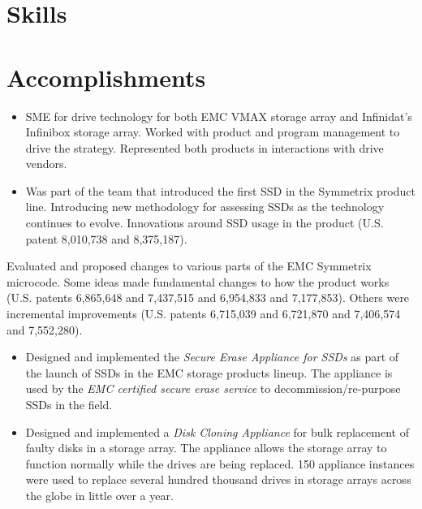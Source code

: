 \documentclass[12pt,a4paper,sans]{moderncv}
\begin{document}
\makecvtitle

\section{Skills}
\section{Accomplishments}
{\begin{itemize}
        \item {SME for drive technology for both EMC VMAX storage array and Infinidat's
        Infinibox storage array.  Worked with product and program management to drive the strategy.
    Represented both products in interactions with drive vendors.}
        \item {Was part of the team that introduced the first SSD in the Symmetrix product line. Introducing
        new methodology for assessing SSDs as the technology continues to evolve. Innovations around SSD
        usage in the product (U.S. patent 8,010,738 and 8,375,187).}
    \end{itemize}}
 {Evaluated and proposed changes to various parts of the EMC
        Symmetrix microcode.  Some ideas made fundamental changes to how the product works
	       (U.S. patents 6,865,648 and 7,437,515 and 6,954,833 and 7,177,853). Others were
           incremental improvements (U.S. patents 6,715,039 and 6,721,870 and 7,406,574 and 7,552,280).}
{\begin{itemize}
         \item {Designed and implemented the {\em Secure Erase Appliance for SSDs} as part of the launch of SSDs
         in the EMC storage products lineup. The appliance is used by the
         {\em EMC certified secure erase service} to decommission/re-purpose SSDs in the field.}
     \item  {Designed and implemented a {\em Disk Cloning Appliance} for bulk replacement of faulty
             disks in a storage array. The appliance allows the storage array to function normally while
             the drives are being replaced. 150 appliance instances were used to replace several hundred
             thousand drives in storage arrays across the globe in little over a year.}
\end{itemize}}
\end{document}
